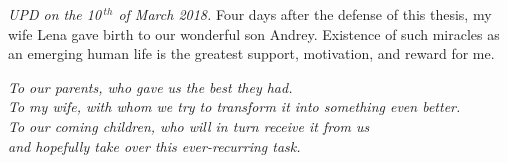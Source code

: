 \textit{UPD on the 10$\,^{th}$ of March 2018.} Four days after the defense of this
thesis, my wife Lena gave birth to our wonderful son Andrey. Existence of such
miracles as an emerging human life is the greatest support, motivation, and
reward for me.

\newpage

\hbox{}

\vfil

\begin{flushright}
\noindent 
\textit{To our parents, who gave us the best they had.} \\[.15cm]
\textit{To my wife, with whom we try to transform it into something even
better.} \\[.15cm]
\textit{To our coming children, who will in turn receive it from us \\ and
hopefully take over this ever-recurring task.}
\end{flushright}

\vfil\vfil\vfil\vfil\vfil

\hbox{}
